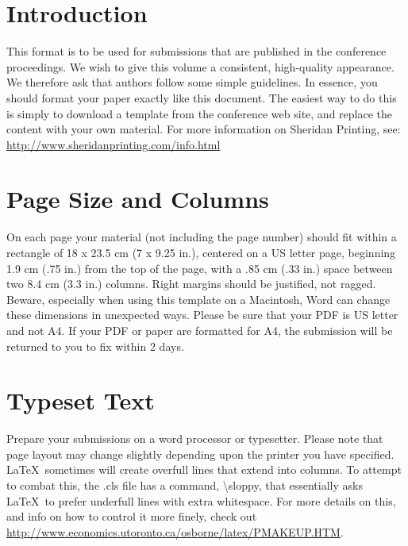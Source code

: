 \documentclass{sigchi}
\begin{document}

\section{Introduction}

This format is to be used for submissions that are
published in the conference proceedings.  We wish to give
this volume a consistent, high-quality appearance. We
therefore ask that authors follow some simple
guidelines. In essence, you should format your paper
exactly like this document. The easiest way to do this is
simply to download a template from the conference web
site, and replace the content with your own material.
For more information on Sheridan Printing, see: 
\url{http://www.sheridanprinting.com/info.html}

\section{Page Size and Columns}

On each page your material (not including the page number) should fit
within a rectangle of 18 x 23.5 cm (7 x 9.25 in.), centered on a US
letter page, beginning 1.9 cm (.75 in.) from the top of the page, with
a .85 cm (.33 in.) space between two 8.4 cm (3.3 in.) columns.  Right
margins should be justified, not ragged. Beware, especially when using
this template on a Macintosh, Word can change these dimensions in
unexpected ways. Please be sure that your PDF is US letter and not
A4. If your PDF or paper are formatted for A4, the submission will be
returned to you to fix within 2 days.

\section{Typeset Text}

Prepare your submissions on a word processor or typesetter.  Please
note that page layout may change slightly depending upon the printer
you have specified.  \LaTeX\ sometimes will create overfull lines
that extend into columns.  To attempt to combat this, the .cls
file has a command, {\textbackslash}sloppy, that essentially asks
\LaTeX\ to prefer underfull lines with extra whitespace.  For more
details on this, and info on how to control it more finely, check out
{\url{http://www.economics.utoronto.ca/osborne/latex/PMAKEUP.HTM}}.
\end{document}
